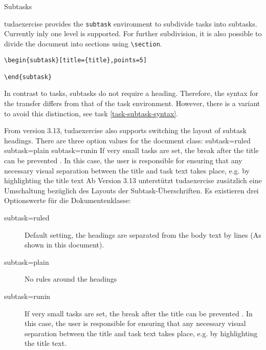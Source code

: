 \documentclass[
	english,%
	accentcolor=9c,%
	points=true, to activate referencing task properties
]{tudaexercise}
\newcommand*{\code}[1]{\texttt{#1}}
\newcommand*{\cls}[1]{\textsf{#1}}
\let\tbs\textbackslash
\begin{document}
\begin{task}{Subtasks}
	\begin{subtask}[title={Basic structure}]
		\cls{tudaexercise} provides the \code{subtask} environment to subdivide tasks into subtasks.
		Currently inly one level is supported.
		For further subdivision, it is also possible to divide the document into sections using \code{\tbs{}section}.

\begin{verbatim}
\begin{subtask}[title={title},points=5]

\end{subtask}
\end{verbatim}

		In contrast to tasks, subtasks do not require a heading.
		Therefore, the syntax for the transfer differs from that of the task environment. However, there is a variant to avoid this distinction, see task \ref{task-subtask-syntax}.
	\end{subtask}

	\begin{subtask}[title={Layout modification of the headings}]
		From version 3.13, \cls{tudaexercise} also supports switching the layout of subtask headings.
		There are three option values for the document class:
		subtask=ruled
		subtask=plain
		subtask=runin If very small tasks are set, the break after the title can be prevented . In this case, the user is responsible
		for ensuring that any necessary visual separation between the title and task text takes place, e.g. by
		highlighting the title text
		Ab Version 3.13 unterstützt \cls{tudaexercise} zusätzlich eine Umschaltung bezüglich des Layouts der Subtask-Überschriften. Es existieren drei Optionswerte für die Dokumentenklasse:
		\begin{description}
			\item[subtask=ruled] Default setting, the headings are separated from the body text by lines (As shown in this document).
			\item[subtask=plain] No rules around the headings
			\item[subtask=runin] If very small tasks are set, the break after the title can be prevented . In this case, the user is responsible
			      for ensuring that any necessary visual separation between the title and task text takes place, e.g. by highlighting the title text.
		\end{description}
	\end{subtask}
\end{task}
\end{document}
